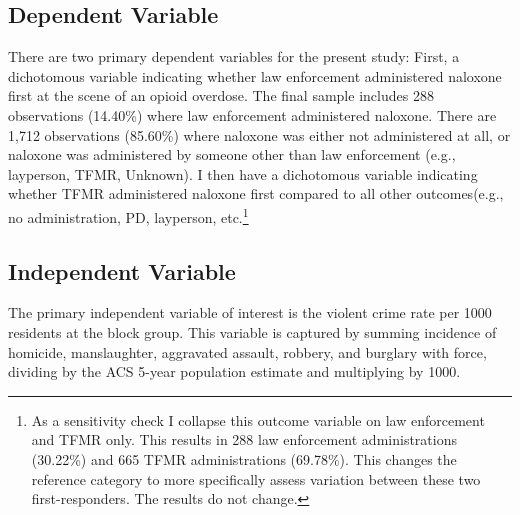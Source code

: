 \subsection{Dependent Variable}
There are two primary dependent variables for the present study: First, a dichotomous variable indicating whether law enforcement administered naloxone first at the scene of an opioid overdose. The final sample includes 288 observations (14.40\%) where law enforcement administered naloxone. There are 1,712 observations (85.60\%) where naloxone was either not administered at all, or naloxone was administered by someone other than law enforcement (e.g., layperson, TFMR, Unknown). I then have a dichotomous variable indicating whether TFMR administered naloxone first compared to all other outcomes(e.g., no administration, PD, layperson, etc.\footnote{As a sensitivity check I collapse this outcome variable on law enforcement and TFMR only. This results in 288 law enforcement administrations (30.22\%) and 665 TFMR administrations (69.78\%). This changes the reference category to more specifically assess variation between these two first-responders. The results do not change.}

\subsection{Independent Variable}
The primary independent variable of interest is the violent crime rate per 1000 residents at the block group. This variable is captured by summing incidence of homicide, manslaughter, aggravated assault, robbery, and burglary with force, dividing by the ACS 5-year population estimate and multiplying by 1000.

